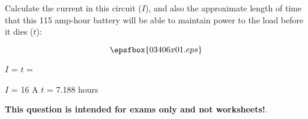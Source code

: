 

Calculate the current in this circuit ($I$), and also the approximate length of time that this 115 amp-hour battery will be able to maintain power to the load before it dies ($t$):

$$\epsfbox{03406x01.eps}$$

$I$ = \hskip 150pt $t$ = 







$I$ = 16 A \hskip 100pt $t$ = 7.188 hours







{\bf This question is intended for exams only and not worksheets!}.



